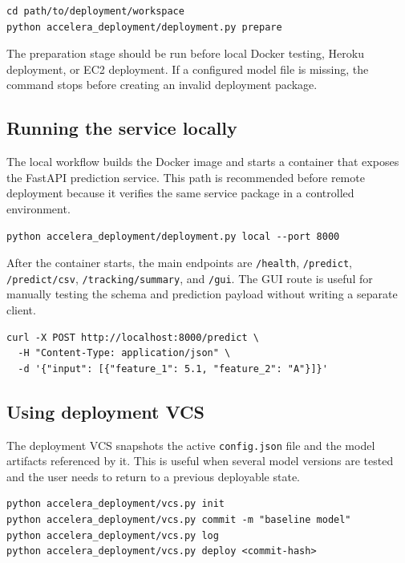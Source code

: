 \documentclass[12pt,a4paper]{report}
\newcommand{\modulepath}[1]{\texttt{#1}}
\begin{document}
\begin{lstlisting}[style=code,caption={Preparing a deployment workspace}]
cd path/to/deployment/workspace
python accelera_deployment/deployment.py prepare
\end{lstlisting}

\noindent The preparation stage should be run before local Docker testing,
Heroku deployment, or EC2 deployment. If a configured model file is missing,
the command stops before creating an invalid deployment package.

\subsection{Running the service locally}
The local workflow builds the Docker image and starts a container that exposes
the FastAPI prediction service. This path is recommended before remote
deployment because it verifies the same service package in a controlled
environment.

\begin{lstlisting}[style=code,caption={Building and running the local deployment service}]
python accelera_deployment/deployment.py local --port 8000
\end{lstlisting}

\noindent After the container starts, the main endpoints are
\modulepath{/health}, \modulepath{/predict}, \modulepath{/predict/csv},
\modulepath{/tracking/summary}, and \modulepath{/gui}. The GUI route is useful
for manually testing the schema and prediction payload without writing a
separate client.

\begin{lstlisting}[style=code,caption={Calling the deployed prediction endpoint}]
curl -X POST http://localhost:8000/predict \
  -H "Content-Type: application/json" \
  -d '{"input": [{"feature_1": 5.1, "feature_2": "A"}]}'
\end{lstlisting}

\subsection{Using deployment VCS}
The deployment VCS snapshots the active \modulepath{config.json} file and the
model artifacts referenced by it. This is useful when several model versions
are tested and the user needs to return to a previous deployable state.

\begin{lstlisting}[style=code,caption={Creating and restoring deployment snapshots}]
python accelera_deployment/vcs.py init
python accelera_deployment/vcs.py commit -m "baseline model"
python accelera_deployment/vcs.py log
python accelera_deployment/vcs.py deploy <commit-hash>
\end{lstlisting}
\end{document}
